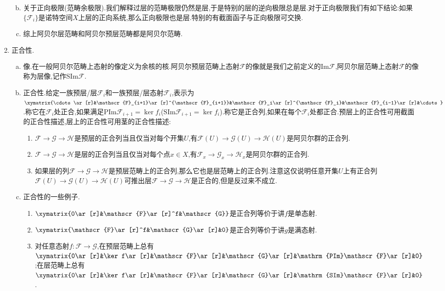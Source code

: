 \begin{enumerate}
\begin{enumerate}[(a)]
\begin{enumerate}[(1)]
		\end{enumerate}
		\item 关于正向极限(范畴余极限).我们解释过层的范畴极限仍然是层,于是特别的层的逆向极限总是层.对于正向极限我们有如下结论:如果$\{\mathscr{F}_i\}$是诺特空间$X$上层的正向系统,那么正向极限也是层.特别的有截面函子与正向极限可交换.
		\item 综上阿贝尔层范畴和阿贝尔预层范畴都是阿贝尔范畴.
	\end{enumerate}
	\item 正合性.
	\begin{enumerate}[(a)]
		\item 像.在一般阿贝尔范畴上态射的像定义为余核的核.阿贝尔预层范畴上态射$\mathscr{F}$的像就是我们之前定义的$\mathrm{Im}\mathscr{F}$,阿贝尔层范畴上态射$\mathscr{F}$的像称为层像,记作$\mathrm{SIm}\mathscr{F}$.
		\item 正合性.给定一族预层/层$\mathscr{F}_i$和一族预层/层态射$\mathscr{F}_i$,表示为$\xymatrix{\cdots\ar[r]&\mathscr{F}_{i+1}\ar[r]^{\mathscr{F}_{i+1}}&\mathscr{F}_i\ar[r]^{\mathscr{F}_i}&\mathscr{F}_{i-1}\ar[r]&\cdots}$.称它在$\mathscr{F}_i$处正合,如果满足$\mathrm{PIm}\mathscr{F}_{i+1}=\ker f_i$($\mathrm{SIm}\mathscr{F}_{i+1}=\ker f_i$).称它是正合列,如果在每个$\mathscr{F}_i$处都正合.预层上的正合性可用截面的正合性描述,层上的正合性可用茎的正合性描述:
		\begin{enumerate}[(1)]
			\item $\mathscr{F}\to\mathscr{G}\to\mathscr{H}$是预层的正合列当且仅当对每个开集$U$,有$\mathscr{F}(U)\to\mathscr{G}(U)\to\mathscr{H}(U)$是阿贝尔群的正合列.
			\item $\mathscr{F}\to\mathscr{G}\to\mathscr{H}$是层的正合列当且仅当对每个点$x\in X$,有$\mathscr{F}_x\to\mathscr{G}_x\to\mathscr{H}_x$是阿贝尔群的正合列.
			\item 如果层的列$\mathscr{F}\to\mathscr{G}\to\mathscr{H}$是预层范畴上的正合列,那么它也是层范畴上的正合列.注意这仅说明任意开集$U$上有正合列$\mathscr{F}(U)\to\mathscr{G}(U)\to\mathscr{H}(U)$可推出层$\mathscr{F}\to\mathscr{G}\to\mathscr{H}$是正合的,但是反过来不成立.
		\end{enumerate}
		\item 正合性的一些例子.
		\begin{enumerate}[(1)]
			\item $\xymatrix{0\ar[r]&\mathscr{F}\ar[r]^f&\mathscr{G}}$是正合列等价于讲$f$是单态射.
			\item $\xymatrix{\mathscr{F}\ar[r]^f&\mathscr{G}\ar[r]&0}$是正合列等价于讲$g$是满态射.
			\item 对任意态射$f:\mathscr{F}\to\mathscr{G}$,在预层范畴上总有$\xymatrix{0\ar[r]&\ker f\ar[r]&\mathscr{F}\ar[r]&\mathscr{G}\ar[r]&\mathrm{PIm}\mathscr{F}\ar[r]&0}$;在层范畴上总有$\xymatrix{0\ar[r]&\ker f\ar[r]&\mathscr{F}\ar[r]&\mathscr{G}\ar[r]&\mathrm{SIm}\mathscr{F}\ar[r]&0}$.

\end{enumerate}
\end{enumerate}
\end{enumerate}
